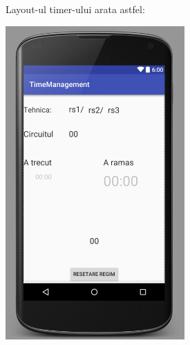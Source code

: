 Layout-ul timer-ului arata astfel:
\begin{center}
\includegraphics[width=0.4\linewidth]{img3}
\end{center}

